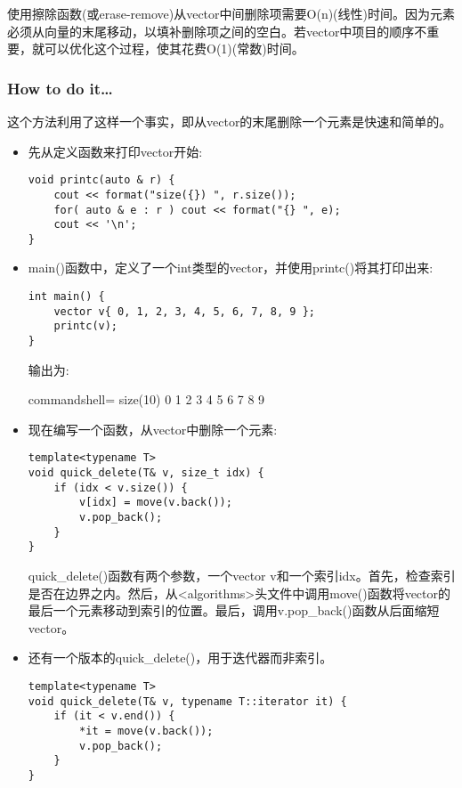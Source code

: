 
使用擦除函数(或erase-remove)从vector中间删除项需要O(n)(线性)时间。因为元素必须从向量的末尾移动，以填补删除项之间的空白。若vector中项目的顺序不重要，就可以优化这个过程，使其花费O(1)(常数)时间。

\subsubsection{How to do it…}

这个方法利用了这样一个事实，即从vector的末尾删除一个元素是快速和简单的。

\begin{itemize}
\item 
先从定义函数来打印vector开始:

\begin{lstlisting}[style=styleCXX]
void printc(auto & r) {
	cout << format("size({}) ", r.size());
	for( auto & e : r ) cout << format("{} ", e);
	cout << '\n';
}
\end{lstlisting}

\item 
main()函数中，定义了一个int类型的vector，并使用printc()将其打印出来:

\begin{lstlisting}[style=styleCXX]
int main() {
	vector v{ 0, 1, 2, 3, 4, 5, 6, 7, 8, 9 };
	printc(v);
}
\end{lstlisting}

输出为:

\begin{tcblisting}{commandshell={}}
size(10) 0 1 2 3 4 5 6 7 8 9
\end{tcblisting}

\item 
现在编写一个函数，从vector中删除一个元素:

\begin{lstlisting}[style=styleCXX]
template<typename T>
void quick_delete(T& v, size_t idx) {
	if (idx < v.size()) {
		v[idx] = move(v.back());
		v.pop_back();
	}
}
\end{lstlisting}

quick\_delete()函数有两个参数，一个vector v和一个索引idx。首先，检查索引是否在边界之内。然后，从<algorithms>头文件中调用move()函数将vector的最后一个元素移动到索引的位置。最后，调用v.pop\_back()函数从后面缩短vector。

\item 
还有一个版本的quick\_delete()，用于迭代器而非索引。

\begin{lstlisting}[style=styleCXX]
template<typename T>
void quick_delete(T& v, typename T::iterator it) {
	if (it < v.end()) {
		*it = move(v.back());
		v.pop_back();
	}
}
\end{lstlisting}


\end{itemize}
